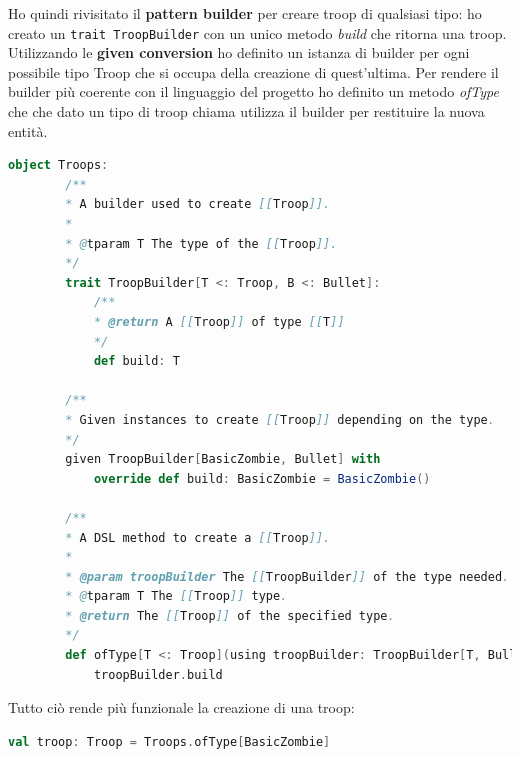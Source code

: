 Ho quindi rivisitato il \textbf{pattern builder} per creare troop di qualsiasi tipo: ho creato un \texttt{trait TroopBuilder}
con un unico metodo \textit{build} che ritorna una troop.
Utilizzando le \textbf{given conversion} ho definito un istanza di builder per ogni possibile tipo Troop che si occupa
della creazione di quest'ultima.
Per rendere il builder più coerente con il linguaggio del progetto ho definito un metodo \textit{ofType} che che dato un tipo
di troop chiama utilizza il builder per restituire la nuova entità.
\begin{lstlisting}[language=Scala]
    object Troops:
        /**
        * A builder used to create [[Troop]].
        *
        * @tparam T The type of the [[Troop]].
        */
        trait TroopBuilder[T <: Troop, B <: Bullet]:
            /**
            * @return A [[Troop]] of type [[T]]
            */
            def build: T

        /**
        * Given instances to create [[Troop]] depending on the type.
        */
        given TroopBuilder[BasicZombie, Bullet] with
            override def build: BasicZombie = BasicZombie()

        /**
        * A DSL method to create a [[Troop]].
        *
        * @param troopBuilder The [[TroopBuilder]] of the type needed.
        * @tparam T The [[Troop]] type.
        * @return The [[Troop]] of the specified type.
        */
        def ofType[T <: Troop](using troopBuilder: TroopBuilder[T, Bullet]): T =
            troopBuilder.build
\end{lstlisting}

Tutto ciò rende più funzionale la creazione di una troop:
\begin{lstlisting}[language=Scala]
    val troop: Troop = Troops.ofType[BasicZombie]
\end{lstlisting}

